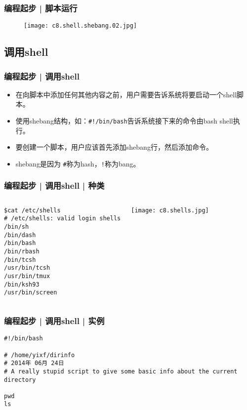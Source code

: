 \begin{frame}
  \frametitle{编程起步 | 脚本运行}
  \begin{figure}
    \centering
    \texttt{[image: c8.shell.shebang.02.jpg]}
  \end{figure}
\end{frame}

\subsection{调用shell}
\begin{frame}[fragile]
  \frametitle{编程起步 | \alert{调用shell}}
  \begin{itemize}
    \item 在向脚本中添加任何其他内容之前，用户需要告诉系统将要启动一个shell脚本。
    \item 使用shebang结构，如：\verb|#!/bin/bash|告诉系统接下来的命令由bash shell执行。
    \item 要创建一个脚本，用户应该首先添加shebang行，然后添加命令。
    \item shebang是因为 \verb|#|称为hash，\verb|!|称为bang。
  \end{itemize}
\end{frame}

\begin{frame}[fragile]
  \frametitle{编程起步 | 调用shell | 种类}
  \begin{columns}
\begin{lstlisting}
$cat /etc/shells
# /etc/shells: valid login shells
/bin/sh
/bin/dash
/bin/bash
/bin/rbash
/bin/tcsh
/usr/bin/tcsh
/usr/bin/tmux
/bin/ksh93
/usr/bin/screen
\end{lstlisting}
    \texttt{[image: c8.shells.jpg]}
  \end{columns}
\end{frame}

\begin{frame}[fragile]
  \frametitle{编程起步 | 调用shell | 实例}
\begin{lstlisting}
#!/bin/bash

# /home/yixf/dirinfo
# 2014年 06月 24日
# A really stupid script to give some basic info about the current directory

pwd
ls
\end{lstlisting}
\end{frame}

